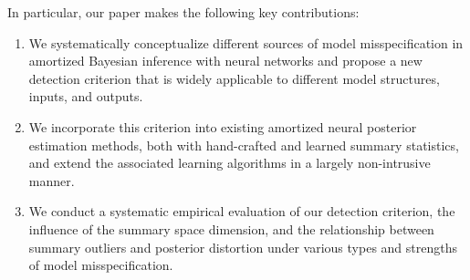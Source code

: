 \documentclass[twoside,11pt]{article}
\newcommand{\0}{\boldsymbol{0}}
\begin{document}
In particular, our paper makes the following key contributions:
\begin{enumerate}[label=(\roman*)]
    \item We systematically conceptualize different sources of model misspecification in amortized Bayesian inference with neural networks and propose a new detection criterion that is widely applicable to different model structures, inputs, and outputs.
    \item We incorporate this criterion into existing amortized neural posterior estimation methods, both with hand-crafted and learned summary statistics, and extend the associated learning algorithms in a largely non-intrusive manner.
    \item We conduct a systematic empirical evaluation of our detection criterion, the influence of the summary space dimension, and the relationship between summary outliers and posterior distortion under various types and strengths of model misspecification.
\end{enumerate}
\end{document}
